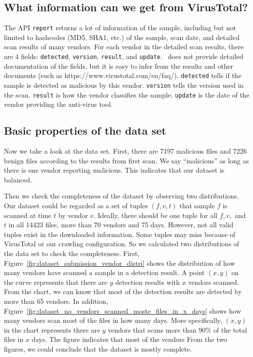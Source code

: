 \subsection{What information can we get from VirusTotal?}%

The API \texttt{report} returns a lot of information of the sample, including but not limited to hashcodes (MD5, SHA1, etc.) of the sample, scan date, and detailed scan results of many vendors. For each vendor in the detailed scan results, there are 4 fields: \texttt{detected}, \texttt{version}, \texttt{result}, and \texttt{update}. \vt\ does not provide detailed documentation of the fields, but it is easy to infer from the results and other documents (such as https://www.virustotal.com/en/faq/). \texttt{detected} tells if the sample is detected as malicious by this vendor. \texttt{version} tells the version used in the scan. \texttt{result} is how the vendor classifies the sample. \texttt{update} is the date of the vendor providing the anti-virus tool.

\subsection{Basic properties of the data set}

Now we take a look at the data set. First, there are 7197 malicious files and 7226 benign files according to the results from first scan. We say ``malicious'' as long as there is one vendor reporting malicious. This indicates that our dataset is balanced.

Then we check the completeness of the dataset by observing two distributions. 
Our dataset could be regarded as a set of tuples $(f, v, t)$ that sample $f$ is scanned at time $t$ by vendor $v$. Ideally, there should be one tuple for all $f, v, $ and $t$ in all 14423 files, more than 70 vendors and 75 days. 
However, not all valid tuples exist in the downloaded information. Some tuples may miss because of VirusTotal or our crawling configuration. So we calculated two distributions of the data set to check the completeness.
First, Figure~\ref{fig:dataset_submission_vendor_distri} shows the distribution of how many vendors have scanned a sample in a detection result. A point $(x, y)$ on the curve represents that there are $y$ detection results with $x$ vendors scanned. From the chart, we can know that most of the detection results are detected by more than 65 vendors. 
In addition, Figure~\ref{fig:dataset_no_vendors_scanned_moste_files_in_x_days} shows  how many vendors scan most of the files in how many days. More specifically, $(x, y)$ in the chart represents there are $y$ vendors that scans more than 90\% of the total files in $x$ days. The figure indicates that most of the vendors 
From the two figures, we could conclude that the dataset is mostly complete.

